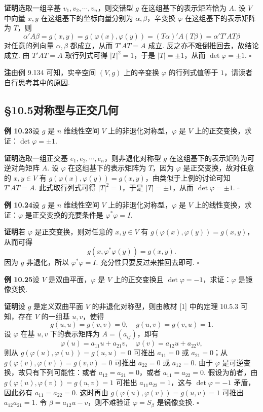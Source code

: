 \documentclass[UTF8, 12pt, fontset=fandol, oneside]{ctexart}
\begin{document}
\noindent\textbf{证明}\quad 选取一组辛基 $v_1,v_2,\cdots,v_n$，则交错型 $g$ 在这组基下的表示矩阵恰为 $A$. 设 $V$ 中向量 $x,y$ 在这组基下的坐标向量分别为 $\alpha,\beta$，辛变换 $\varphi$ 在这组基下的表示矩阵为 $T$，则
\[
\alpha'A\beta=g(x,y)=g(\varphi(x),\varphi(y))=(T\alpha)'A(T\beta)=\alpha'T'AT\beta
\]
对任意的列向量 $\alpha,\beta$ 都成立，从而 $T'AT=A$ 成立. 反之亦不难倒推回去，故结论成立. 由 $T'AT=A$ 取行列式可得 $|T|^2=1$，于是 $|T|=\pm1$，从而 $\det\varphi=\pm1$. $\square$

\noindent\textbf{注}\quad 由例 9.134 可知，实辛空间 $(V,g)$ 上的辛变换 $\varphi$ 的行列式值等于 $1$，请读者自行思考其中的原因.

\subsection*{§10.5\quad 对称型与正交几何}

\noindent\textbf{例 10.23}\quad 设 $g$ 是 $n$ 维线性空间 $V$ 上的非退化对称型，$\varphi$ 是 $V$ 上的正交变换，求证：$\det\varphi=\pm1$.

\noindent\textbf{证明}\quad 选取一组正交基 $e_1,e_2,\cdots,e_n$，则非退化对称型 $g$ 在这组基下的表示矩阵为可逆对角矩阵 $A$. 设 $\varphi$ 在这组基下的表示矩阵为 $T$，因为 $\varphi$ 是正交变换，故对任意的 $x,y\in V$ 有 $g(\varphi(x),\varphi(y))=g(x,y)$，由类似于上例的讨论可知 $T'AT=A$. 此式取行列式可得 $|T|^2=1$，于是 $|T|=\pm1$，从而 $\det\varphi=\pm1$. $\square$

\noindent\textbf{例 10.24}\quad 设 $g$ 是 $n$ 维线性空间 $V$ 上的非退化对称型，$\varphi$ 是 $V$ 上的线性变换，求证：$\varphi$ 是正交变换的充要条件是 $\varphi^*\varphi=I$.

\noindent\textbf{证明}\quad 若 $\varphi$ 是正交变换，则对任意的 $x,y\in V$ 有 $g(\varphi(x),\varphi(y))=g(x,y)$，从而可得
\[
g(x,\varphi^*\varphi(y))=g(x,y).
\]
因为 $g$ 非退化，所以 $\varphi^*\varphi=I$. 充分性只要反过来推回去即可. $\square$

\noindent\textbf{例 10.25}\quad 设 $V$ 是双曲平面，$\varphi$ 是 $V$ 上的正交变换且 $\det\varphi=-1$，求证：$\varphi$ 是镜像变换.

\noindent\textbf{证明}\quad 设 $g$ 是定义双曲平面 $V$ 的非退化对称型，则由教材 [1] 中的定理 10.5.3 可知，存在 $V$ 的一组基 $u,v$，使得
\[
g(u,u)=g(v,v)=0,\quad g(u,v)=g(v,u)=1.
\]
设 $\varphi$ 在基 $u,v$ 下的表示矩阵为 $A=(a_{ij})$，即有
\[
\varphi(u)=a_{11}u+a_{21}v,\quad \varphi(v)=a_{12}u+a_{22}v,
\]
则从 $g(\varphi(u),\varphi(u))=g(u,u)=0$ 可推出 $a_{11}=0$ 或 $a_{21}=0$；从 $g(\varphi(v),\varphi(v))=g(v,v)=0$ 可推出 $a_{22}=0$ 或 $a_{12}=0$. 由于 $\varphi$ 是可逆变换，故只有下列可能性：或者 $a_{12}=a_{21}=0$，或者 $a_{11}=a_{22}=0$. 假设为前者，由 $g(\varphi(u),\varphi(v))=g(u,v)=1$ 可推出 $a_{11}a_{22}=1$，这与 $\det\varphi=-1$ 矛盾，因此必有 $a_{11}=a_{22}=0$. 这时再由 $g(\varphi(u),\varphi(v))=g(u,v)=1$ 可推出 $a_{12}a_{21}=1$. 令 $\beta=a_{12}u-v$，则不难验证 $\varphi=S_\beta$ 是镜像变换. $\square$
\end{document}
